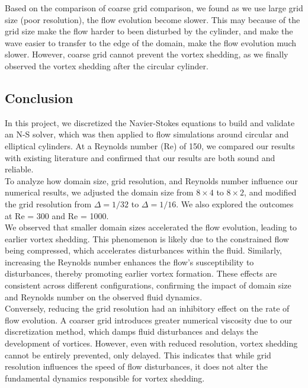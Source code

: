 \documentclass[12pt]{article}
\begin{document}
Based on the comparison of coarse grid comparison, we found as we use large grid size (poor resolution), the flow evolution become slower. This may because of the grid size make the flow harder to been disturbed by the cylinder, and make the wave easier to transfer to the edge of the domain, make the flow evolution much slower. However, coarse grid cannot prevent the vortex shedding, as we finally observed the vortex shedding after the circular cylinder.





\subsection{Conclusion}
In this project, we discretized the Navier-Stokes equations to build and validate an N-S solver, which was then applied to flow simulations around circular and elliptical cylinders. At a Reynolds number (Re) of 150, we compared our results with existing literature and confirmed that our results are both sound and reliable.\\

To analyze how domain size, grid resolution, and Reynolds number influence our numerical results, we adjusted the domain size from $8 \times 4$ to $8 \times 2$, and modified the grid resolution from $\Delta = 1/32$ to $\Delta = 1/16$. We also explored the outcomes at Re = 300 and Re = 1000.\\

We observed that smaller domain sizes accelerated the flow evolution, leading to earlier vortex shedding. This phenomenon is likely due to the constrained flow being compressed, which accelerates disturbances within the fluid. Similarly, increasing the Reynolds number enhances the flow's susceptibility to disturbances, thereby promoting earlier vortex formation. These effects are consistent across different configurations, confirming the impact of domain size and Reynolds number on the observed fluid dynamics.\\

Conversely, reducing the grid resolution had an inhibitory effect on the rate of flow evolution. A coarser grid introduces greater numerical viscosity due to our discretization method, which damps fluid disturbances and delays the development of vortices. However, even with reduced resolution, vortex shedding cannot be entirely prevented, only delayed. This indicates that while grid resolution influences the speed of flow disturbances, it does not alter the fundamental dynamics responsible for vortex shedding.
\end{document}
